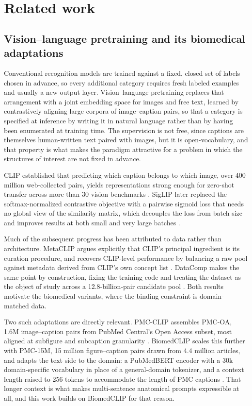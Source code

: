 \section{Related work}
\label{sec:related}

\subsection{Vision--language pretraining and its biomedical adaptations}

Conventional recognition models are trained against a fixed, closed set of
labels chosen in advance, so every additional category requires fresh labeled
examples and usually a new output layer. Vision--language pretraining replaces
that arrangement with a joint embedding space for images and free text, learned
by contrastively aligning large corpora of image--caption pairs, so that a
category is specified at inference by writing it in natural language rather than
by having been enumerated at training time. The supervision is not free, since
captions are themselves human-written text paired with images, but it is
open-vocabulary, and that property is what makes the paradigm attractive for a
problem in which the structures of interest are not fixed in advance.

CLIP established that predicting which caption belongs to which image, over 400
million web-collected pairs, yields representations strong enough for zero-shot
transfer across more than 30 vision benchmarks \cite{radford2021clip}. SigLIP
later replaced the softmax-normalized contrastive objective with a pairwise
sigmoid loss that needs no global view of the similarity matrix, which decouples
the loss from batch size and improves results at both small and very large
batches \cite{zhai2023siglip}.

Much of the subsequent progress has been attributed to data rather than
architecture. MetaCLIP argues explicitly that CLIP's principal ingredient is its
curation procedure, and recovers CLIP-level performance by balancing a raw pool
against metadata derived from CLIP's own concept list \cite{xu2024metaclip}.
DataComp makes the same point by construction, fixing the training code and
treating the dataset as the object of study across a 12.8-billion-pair candidate
pool \cite{gadre2023datacomp}. Both results motivate the biomedical variants,
where the binding constraint is domain-matched data.

Two such adaptations are directly relevant. PMC-CLIP assembles PMC-OA, 1.6M
image--caption pairs from PubMed Central's Open Access subset, most aligned at
subfigure and subcaption granularity \cite{lin2023pmcclip}. BiomedCLIP scales
this further with PMC-15M, 15 million figure--caption pairs drawn from 4.4
million articles, and adapts the text side to the domain: a PubMedBERT encoder
with a 30k domain-specific vocabulary in place of a general-domain tokenizer,
and a context length raised to 256 tokens to accommodate the length of PMC
captions \cite{zhang2025biomedclip}. That longer context is what makes
multi-sentence anatomical prompts expressible at all, and this work builds on
BiomedCLIP for that reason.

